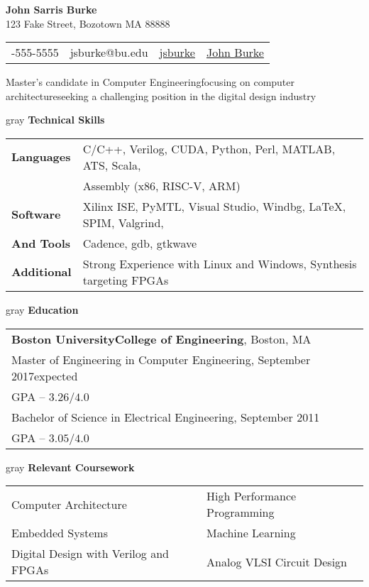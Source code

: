 \documentclass[10.5pt,letterpaper]{article}
\makeatletter
\newcommand{\org}[1]{\textbf{#1}}
\newcommand{\vertspace}{\vspace{1.2mm}}
\newcommand{\horzindent}{\hspace{3mm}}
\newcommand{\latex}{\LaTeX\space}
\newcommand{\tablewidth}{.9\linewidth}
\newcommand{\name}{John Sarris Burke}
\newcommand{\infoshift}{\hspace{15.5mm}}
\newcommand{\address}{123 Fake Street, Bozotown MA 88888}
\newcommand{\phone}{555-555-5555}
\newcommand{\email}{jsburke@bu.edu}
\newcommand{\github}{\href{https://github.com/jsburke/}{jsburke}}
\newcommand{\linkedin}{\href{https://www.linkedin.com/in/john-burke-51325935/}{John Burke}}
\newcommand{\undergradmajor}{Electrical Engineering}
\newcommand{\undergradend}{September 2011}
\newcommand{\grad}{Boston University}
\newcommand{\gradschool}{College of Engineering}
\newcommand{\gradmajor}{Computer Engineering}
\newcommand{\gradend}{September 2017}
\newcommand{\comparch}{computer architecture}
\newcommand{\skills}{focusing on \comparch}
\newcommand{\target}{the digital design industry}
\newcommand{\objective}{Master's candidate in \gradmajor\space \skills\space seeking a challenging position in \target}
\newlength\myheight
\newlength\mydepth
\newcommand*\inlineicon[1]{%
  \settototalheight\myheight{Xygp}%
  \settodepth\mydepth{Xygp}%
  \raisebox{-\mydepth}{\texttt{[image: \#1]}}%
}
\newcommand{\iconemail}{\inlineicon{email-icon-2048}\space}
\newcommand{\icongithub}{\inlineicon{GitHub-Mark-120px-plus}\space}
\newcommand{\iconphone}{\inlineicon{phone-icon-black}\space}
\newcommand{\iconlinkedin}{\inlineicon{linkedin-icon-black}\space}
\makeatother
\begin{document}
	
	\begin{center}	
		\textbf{\large \name}\\
		\address\\
		\begin{tabular}{c||c||c||c}
			\infoshift \iconphone \phone & \iconemail \email & \icongithub \github & \iconlinkedin \linkedin \\
		\end{tabular}
		\newline \objective
	\end{center}

	\noindent
	\begin{heading}{gray}
		\textbf{Technical Skills}
	\end{heading}
	\begin{tabular*}{\tablewidth}{l|l}
		\textbf{Languages} & C/C++, Verilog, CUDA, Python, Perl, MATLAB, ATS, Scala, \\
		  & Assembly (x86, RISC-V, ARM) \\ \hline %
		\textbf{Software} & Xilinx ISE, PyMTL, Visual Studio, Windbg, \latex, SPIM, Valgrind, \\
		  \textbf{And Tools}& Cadence, gdb, gtkwave\\ \hline
		\textbf{Additional} & Strong Experience with Linux and Windows, Synthesis targeting FPGAs
	\end{tabular*}

	\noindent
	\begin{heading}{gray}
		\textbf{Education}
	\end{heading}
		\begin{tabular*}{\tablewidth}{l}
			\org{\grad\space\gradschool}, Boston, MA \\
			\horzindent Master of Engineering in \gradmajor , \gradend\space expected \\
			\horzindent GPA -- $3.26 / 4.0$ \\
			\horzindent Bachelor of Science in \undergradmajor , \undergradend \\
			\horzindent GPA -- $3.05 / 4.0$ \\
		\end{tabular*}

	\iffalse
	
	\vertspace
	\noindent	
	\begin{heading}{gray}
		\textbf{Relevant Coursework}
	\end{heading}
		\begin{tabular*}{\tablewidth}{@{\extracolsep{\fill}}ll}
			Computer Architecture & High Performance Programming \\
			Embedded Systems      & Machine Learning \\
			Digital Design with Verilog and FPGAs & Analog VLSI Circuit Design \\
		\end{tabular*}
		
\end{document}
